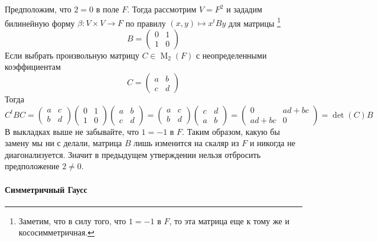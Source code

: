 Предположим, что $2 = 0$ в поле $F$.
Тогда рассмотрим $V = F^2$ и зададим билинейную форму $\beta\colon V\times V\to F$ по правилу $(x,y)\mapsto x^t By$ для матрицы%
\footnote{Заметим, что в силу того, что $1 = -1$ в $F$, то эта матрица еще к тому же и кососимметричная.}
\[
B = 
\begin{pmatrix}
{0}&{1}\\
{1}&{0}
\end{pmatrix}
\]
Если выбрать произвольную матрицу $C \in \operatorname{M}_2(F)$ с неопределенными коэффициентам
\[
C = 
\begin{pmatrix}
{a}&{b}\\
{c}&{d}
\end{pmatrix}
\]
Тогда
\[
C^t B C = 
\begin{pmatrix}
{a}&{c}\\
{b}&{d}
\end{pmatrix}
\begin{pmatrix}
{0}&{1}\\
{1}&{0}
\end{pmatrix}
\begin{pmatrix}
{a}&{b}\\
{c}&{d}
\end{pmatrix}
=
\begin{pmatrix}
{a}&{c}\\
{b}&{d}
\end{pmatrix}
\begin{pmatrix}
{c}&{d}\\
{a}&{b}
\end{pmatrix}
=
\begin{pmatrix}
{0}&{ad + bc}\\
{ad +  bc}&{0}
\end{pmatrix}
=
\det(C)B
\]
В выкладках выше не забывайте, что $1 = -1$ в $F$.
Таким образом, какую бы замену мы ни с делали, матрица $B$ лишь изменится на скаляр из $F$ и никогда не диагонализуется.
Значит в предыдущем утверждении нельзя отбросить предположение $2 \neq 0$.

\paragraph{Симметричный Гаусс}

